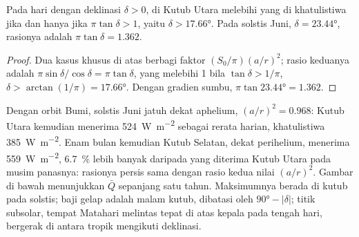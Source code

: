 \begin{proposition}\label{prop:b1:radiation-heat-transport:polar-summer}
Pada hari dengan deklinasi $\delta > 0$,  di Kutub Utara melebihi
yang di khatulistiwa jika dan hanya jika $\pi\tan\delta > 1$, yaitu $\delta >
\ang{17.66}$. Pada solstis Juni, $\delta = \ang{23.44}$, rasionya adalah $\pi\tan
\delta = 1.362$.
\end{proposition}

\begin{proof}
Dua kasus khusus di atas berbagi faktor $(S_0/\pi)(a/r)^2$; rasio keduanya adalah
$\pi\sin\delta/\cos\delta = \pi\tan\delta$, yang melebihi 1 bila $\tan\delta >
1/\pi$, $\delta > \arctan(1/\pi) = \ang{17.66}$. Dengan gradien sumbu,
$\pi\tan\ang{23.44} = 1.362$.
\end{proof}

Dengan orbit Bumi, solstis Juni jatuh dekat aphelium, $(a/r)^2 = 0.968$: Kutub Utara
kemudian menerima \qty{524}{W.m^{-2}} sebagai rerata harian, khatulistiwa
\qty{385}{W.m^{-2}}. Enam bulan kemudian Kutub Selatan, dekat perihelium, menerima
\qty{559}{W.m^{-2}}, \qty{6.7}{\percent} lebih banyak daripada yang diterima Kutub Utara
pada musim panasnya: rasionya persis sama dengan rasio kedua nilai $(a/r)^2$. Gambar
di bawah menunjukkan $\bar Q$ sepanjang satu tahun. Maksimumnya berada di kutub pada
solstis; baji gelap adalah malam kutub, dibatasi oleh  $\ang{90} -
|\delta|$;
titik subsolar, tempat Matahari melintas tepat di atas kepala pada tengah hari,
bergerak di antara tropik mengikuti deklinasi.

